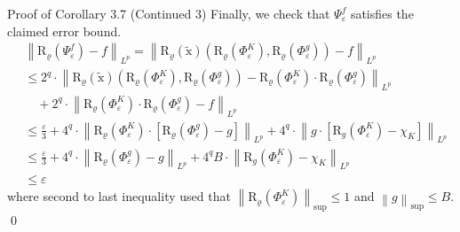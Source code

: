 \documentclass{if-beamer}
\newcommand{\norm}[2]{\left\lVert#1\right\rVert_{#2}}
\begin{document}
\begin{frame}{Proof of Corollary 3.7 (Continued 3)}
    Finally, we check that $\Psi_{\varepsilon}^{f}$ satisfies the claimed error bound.
    {\small
    \begin{align*}
        &\left\|\mathrm{R}_{\varrho}\left(\Psi_{\varepsilon}^{f}\right)-f\right\|_{L^{p}} =\left\|\mathrm{R}_{\varrho}(\widetilde{\mathrm{x}})\left(\mathrm{R}_{\varrho}\left(\Phi_{\varepsilon}^{K}\right), \mathrm{R}_{\varrho}\left(\Phi_{\varepsilon}^{g}\right)\right)-f\right\|_{L^{p}} \\
        & \leq 2^{q} \cdot\left\|\mathrm{R}_{\varrho}(\widetilde{\mathrm{x}})\left(\mathrm{R}_{\varrho}\left(\Phi_{\varepsilon}^{K}\right), \mathrm{R}_{\varrho}\left(\Phi_{\varepsilon}^{g}\right)\right)-\mathrm{R}_{\varrho}\left(\Phi_{\varepsilon}^{K}\right) \cdot \mathrm{R}_{\varrho}\left(\Phi_{\varepsilon}^{g}\right)\right\|_{L^{p}}\\
        & \quad+2^{q} \cdot\left\|\mathrm{R}_{\varrho}\left(\Phi_{\varepsilon}^{K}\right) \cdot \mathrm{R}_{\varrho}\left(\Phi_{\varepsilon}^{g}\right)-f\right\|_{L^{p}} \\
        & \leq \frac{\varepsilon}{3}+4^{q} \cdot\left\|\mathrm{R}_{\varrho}\left(\Phi_{\varepsilon}^{K}\right) \cdot\left[\mathrm{R}_{\varrho}\left(\Phi_{\varepsilon}^{g}\right)-g\right]\right\|_{L^{p}}+4^{q} \cdot\left\|g \cdot\left[\mathrm{R}_{g}\left(\Phi_{\varepsilon}^{K}\right)-\chi_{K}\right]\right\|_{L^{p}}\\
        &\leq \frac{\varepsilon}{3}+4^{q} \cdot\left\|\mathrm{R}_{\varrho}\left(\Phi_{\varepsilon}^{g}\right)-g\right\|_{L^{p}}+4^{q}B \cdot\left\|\mathrm{R}_{g}\left(\Phi_{\varepsilon}^{K}\right)-\chi_{K}\right\|_{L^{p}}\\
        &\leq \varepsilon
    \end{align*}
    }%
    where second to last inequality used that $\norm{\mathrm{R}_{\varrho}\left(\Phi_{\varepsilon}^{K}\right)}{\sup} \leq 1$ and $\norm{g}{\sup}\leq B$. \qed
\end{frame}
\end{document}

